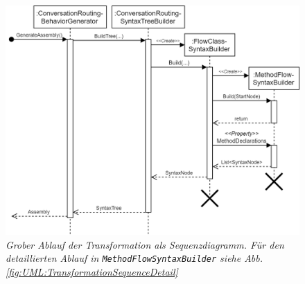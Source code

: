 \begin{figure} %
	\centering
		\includegraphics[width=\textwidth]{img/TransformationSequence.png}
	\caption[Transformationsablauf]{\textit{Grober Ablauf der Transformation als Sequenzdiagramm. Für den detaillierten Ablauf in \texttt{MethodFlowSyntaxBuilder} siehe Abb. \ref{fig:UML:TransformationSequenceDetail} }}
	\label{fig:UML:TransformationSequence}
\end{figure}

